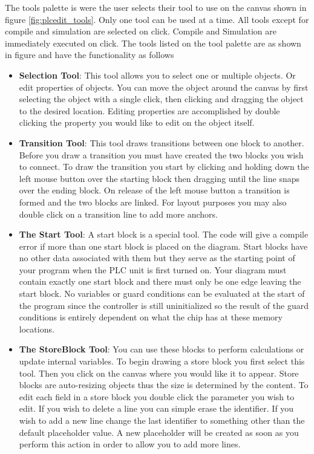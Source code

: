The tools palette is were the user selects their tool to use on the canvas shown in figure \ref{fig:plcedit_tools}. Only one tool can be used at a time. All tools except for compile and simulation are selected on click. Compile and Simulation are immediately executed on click.
The tools listed on the tool palette are as shown in figure %
and have the functionality as follows
\begin{itemize}
\item \textbf{Selection Tool}: This tool allows you to select one or multiple objects. Or edit properties of objects. You can move the object around the canvas by first selecting the object with a single click, then clicking and dragging the object to the desired location. Editing properties are accomplished by double clicking the property you would like to edit on the object itself.
\item \textbf{Transition Tool}: This tool draws transitions between one block to another. Before you draw a transition you must have created the two blocks you wish to connect. To draw the transition you start by clicking and holding down the left mouse button over the starting block then dragging until the line snaps over the ending block. On release of the left mouse button a transition is formed and the two blocks are linked. For layout purposes you may also double click on a transition  line to add more anchors.
\item \textbf{The Start Tool}: A start block is a special tool. The code will give a compile error if more than one start block is placed on the diagram. Start blocks have no other data associated with them but they serve as the starting point of your program when the PLC unit is first turned on. Your diagram must contain exactly one start block and there must only be one edge leaving the start block. No variables or guard conditions can be evaluated at the start of the program since the controller is still uninitialized so the result of the guard conditions is entirely dependent on what the chip has at these memory locations.
\item \textbf{The StoreBlock Tool}: You can use these blocks to perform calculations or update internal variables. To begin drawing a store block you first select this tool. Then you click on the canvas where you would like it to appear. Store blocks are auto-resizing objects thus the size is determined by the content. To edit each field in a store block you double click the parameter you wish to edit. If you wish to delete a line you can simple erase the identifier. If you wish to add a new line change the last identifier to something other than the default placeholder value. A new placeholder will be created as soon as you perform this action in order to allow you to add more lines.

\end{itemize}
